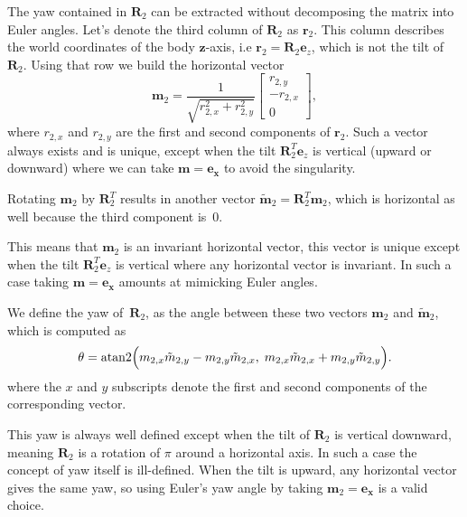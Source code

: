 \documentclass{IJCAS}
\begin{document}
The yaw contained in $\boldsymbol{R}_{2}$ can be extracted without decomposing the
matrix into Euler angles.  Let's denote the third column of $\boldsymbol{R}_{2}$ as $\boldsymbol{r}_{2}$.
This column describes the world coordinates of the body $\boldsymbol{z}$-axis, i.e $\boldsymbol{r}_{2}=\boldsymbol{R}_{2}\boldsymbol{e}_z$, which is not the tilt of $\boldsymbol{R}_{2}$. 
Using that row we build the horizontal vector
\begin{equation}
  \boldsymbol{m}_2
  =
  \dfrac{1}{\sqrt{{r}_{2,x}^{2}+{r}_{2,y}^{2}}}\begin{bmatrix}
    {r}_{2,y}\\[2pt]-{r}_{2,x}\\[2pt]0
  \end{bmatrix},
\end{equation}
where ${r}_{2,x}$ and ${r}_{2,y}$ are the first and second components of 
$\boldsymbol{r}_{2}$. Such a vector always exists and is unique, 
except when the tilt $\boldsymbol{R}_{2}^T \boldsymbol{e}_z$ is vertical (upward or downward) where we can take $\boldsymbol{m}=\boldsymbol{e_x}$ to avoid the singularity.

Rotating $\boldsymbol{m}_2$ by $\boldsymbol{R}_{2}^T$
results in another vector
$\tilde{\boldsymbol{m}}_2=\boldsymbol{R}_{2}^T\boldsymbol{m}_2$, which is horizontal as well
because the third component is~$0$.

This means that  $\boldsymbol{m}_2$ is an invariant horizontal vector, this vector is unique except when the tilt $\boldsymbol{R}_{2}^T \boldsymbol{e}_z$ is vertical where any horizontal vector is invariant. In such a case taking $\boldsymbol{m}=\boldsymbol{e_x}$ amounts at mimicking Euler angles.

We define the yaw of~$\boldsymbol{R}_{2}$, as the angle between these two vectors $\boldsymbol{m}_2$ and $\tilde{\boldsymbol{m}}_2$, which is computed as
\begin{equation}
  \theta
  =
  \operatorname{atan2}\Bigl(
     {m}_{2,x}\tilde{{m}}_{2,y}
    -{m}_{2,y}\tilde{{m}}_{2,x},\;
     {m}_{2,x}\tilde{{m}}_{2,x}
    +{m}_{2,y}\tilde{{m}}_{2,y}
  \Bigr).
  \label{eq:yaw_theta}
\end{equation}
where the $x$ and $y$ subscripts denote the first and second components of the corresponding vector.

This yaw is always well defined except when the tilt of $\boldsymbol{R}_{2}$ is vertical downward, meaning $\boldsymbol{R}_{2}$ is a rotation of $\pi$ around a horizontal axis. In such a case the concept of yaw itself is ill-defined. When the tilt is upward, any horizontal vector gives the same yaw, so using Euler's yaw angle by taking  $\boldsymbol{m}_2=\boldsymbol{e_x}$ is a valid choice.
\end{document}
